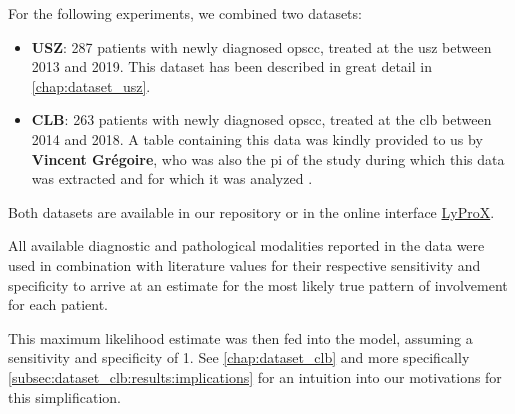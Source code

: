 \begin{tcolorbox}[title=\faIcon{database} Data, parbox=false]
    For the following experiments, we combined two datasets:

    \begin{itemize}[leftmargin=7mm]
        \item[\faIcon{hospital}] \textbf{USZ}: 287 patients with newly diagnosed \gls{opscc}, treated at the \acrlong{usz} between 2013 and 2019. This dataset has been described in great detail in \cref{chap:dataset_usz}.
        \item[\faIcon{hospital}] \textbf{CLB}: 263 patients with newly diagnosed \gls{opscc}, treated at the \acrlong{clb} between 2014 and 2018. A table containing this data was kindly provided to us by \textbf{Vincent Grégoire}, who was also the \gls{pi} of the study during which this data was extracted and for which it was analyzed \cite{bauwens_prevalence_2021}.
    \end{itemize}

    Both datasets are available in our repository  or in the online interface \href{https://lyprox.org/patients/dataset/}{ LyProX}.

    All available diagnostic and pathological modalities reported in the data were used in combination with literature values for their respective sensitivity and specificity \cite{de_bondt_detection_2007} to arrive at an estimate for the most likely true pattern of involvement for each patient.

    This maximum likelihood estimate was then fed into the model, assuming a sensitivity and specificity of 1. See \cref{chap:dataset_clb} and more specifically \cref{subsec:dataset_clb:results:implications} for an intuition into our motivations for this simplification.
\end{tcolorbox}
